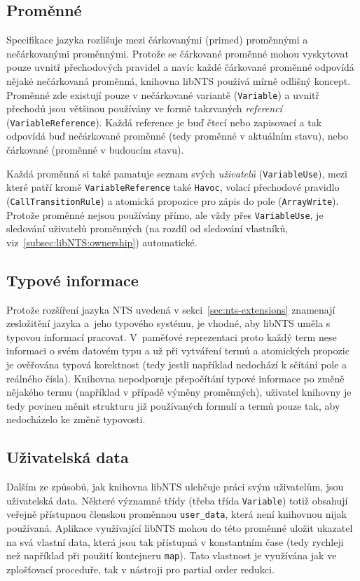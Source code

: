 \documentclass{fithesis2}
\begin{document}

\subsection{Proměnné}
Specifikace jazyka rozlišuje mezi čárkovanými (primed) proměnnými a nečárkovanými proměnnými. Protože se čárkované proměnné mohou vyskytovat pouze uvnitř přechodových pravidel a navíc každé čárkované proměnné odpovídá nějaké nečárkovaná proměnná, knihovna libNTS používá mírně odlišný koncept. Proměnné zde existují pouze v nečárkované variantě (\texttt{Variable}) a uvnitř přechodů jsou většinou používány ve formě takzvaných \textit{referencí} (\texttt{VariableReference}). Každá reference je buď čtecí nebo zapisovací a tak odpovídá buď nečárkované proměnné (tedy proměnné v aktuálním stavu), nebo čárkované (proměnné v budoucím stavu).

\label{subsec:libNTS:variable:use}
Každá proměnná si také pamatuje seznam svých \textit{uživatelů} (\texttt{VariableUse}), mezi které patří kromě \texttt{VariableReference} také \texttt{Havoc}, volací přechodové pravidlo (\texttt{CallTransitionRule}) a atomická propozice pro zápis do pole (\texttt{ArrayWrite}). Protože proměnné nejsou používány přímo, ale vždy přes \texttt{VariableUse}, je sledování uživatelů proměnných (na rozdíl od sledování vlastníků, viz~\ref{subsec:libNTS:ownership}) automatické.

\subsection{Typové informace}
Protože rozšíření jazyka NTS uvedená v sekci~\ref{sec:nts-extensions} znamenají zesložitění jazyka a~jeho typového systému, je vhodné, aby libNTS uměla s typovou informací pracovat. V~paměťové reprezentaci proto každý term nese informaci o svém datovém typu a už při vytváření termů a atomických propozic je ověřována typová korektnost (tedy jestli například nedochází k sčítání pole a reálného čísla). Knihovna nepodporuje přepočítání typové informace po změně nějakého termu (například v případě výměny proměnných), uživatel knihovny je tedy povinen měnit strukturu již používaných formulí a termů pouze tak, aby nedocházelo ke změně typovosti.

\subsection{Uživatelská data}
Dalším ze způsobů, jak knihovna libNTS ulehčuje práci svým uživatelům, jsou uživatelská data. Některé významné třídy (třeba třída \texttt{Variable}) totiž obsahují veřejně přístupnou členskou proměnnou \texttt{user\_data}, která není knihovnou nijak používaná. Aplikace využívající libNTS mohou do této proměnné  uložit ukazatel na svá vlastní data, která jsou tak přístupná v konstantním čase (tedy rychleji než například při použití kontejneru \texttt{map}). Tato vlastnost je využívána jak ve zplošťovací proceduře, tak v nástroji pro partial order redukci.
\end{document}
